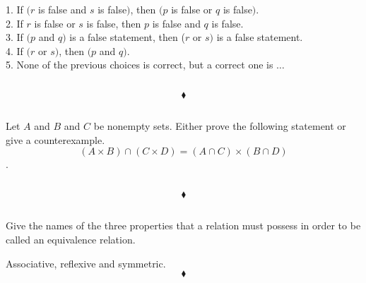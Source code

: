  \subsubsection{}
\begin{tcolorbox}
1. If $(r$ is false and $s$ is false$)$, then $(p$ is false or $q$ is false$)$.  \\

2. If $r$ is false or $s$ is false, then $p$ is false and $q$ is false.   \\

3. If $(p$ and $q)$ is a false statement, then ($r$ or $s)$ is a false statement. \\

4. If $(r$ or $s)$, then $(p$ and $q)$. \\ 

5. None of the previous choices is correct, but a correct one is  $\dots$
\end{tcolorbox}
$$ $$

$$\blacklozenge$$




\renewcommand{\thesubsection}{\thesection.\RomanNumeralCaps{2}}
\subsection{}
\subsubsection{}
\begin{tcolorbox}
Let $A$ and $B$ and $C$ be nonempty sets. Either prove the following statement or give a counterexample. $$(A\times  B) \cap (C\times D) = (A\cap C) \times (B \cap D)$$.
\end{tcolorbox}
$$ $$

$$\blacklozenge$$


\renewcommand{\thesubsection}{\thesection.\RomanNumeralCaps{3}}
\subsection{}
\subsubsection{}
\begin{tcolorbox}
Give the names of the three properties that a relation must possess in order to be called an equivalence relation.
\end{tcolorbox}
$$ $$
Associative, reflexive and symmetric.
$$\blacklozenge$$

